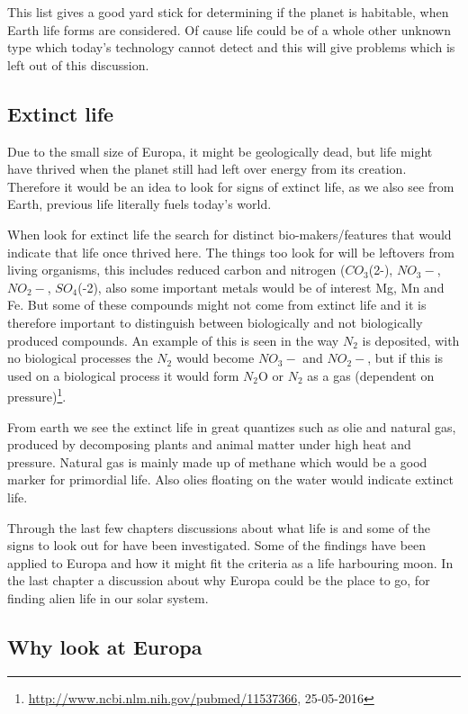 This list gives a good yard stick for determining if the planet is habitable, when Earth life forms are considered. Of cause life could be of a whole other unknown type which today's technology cannot detect and this will give problems which is left out of this discussion.

\subsection{Extinct life}

Due to the small size of Europa, it might be geologically dead, but life might have thrived when the planet still had left over energy from its creation. Therefore it would be an idea to look for signs of extinct life, as we also see from Earth, previous life literally fuels today's world.

When look for extinct life the search for distinct bio-makers/features that would indicate that life once thrived here. The things too look for will be leftovers from living organisms, this includes reduced carbon and nitrogen ($CO_3$(2-), $NO_3-$, $NO_2-$, $SO_4$(-2), also some important metals would be of interest Mg, Mn and Fe. But some of these compounds might not come from extinct life and it is therefore important to distinguish between biologically and not biologically produced compounds. An example of this is seen in the way $N_2$ is deposited, with no biological processes the $N_2$ would become $NO_3-$ and $NO_2-$, but if this is used on a biological process it would form $N_2$O or $N_2$ as a gas  (dependent on pressure)\footnote{\url{http://www.ncbi.nlm.nih.gov/pubmed/11537366}, 25-05-2016}.

From earth we see the extinct life in great quantizes such as olie and natural gas, produced by decomposing plants and animal matter under high heat and pressure. Natural gas is mainly made up of methane which would be a good marker for primordial life. Also olies floating on the water would indicate extinct life.

Through the last few chapters discussions about what life is and some of the signs to look out for have been investigated. Some of the findings have been applied to Europa and how it might fit the criteria as a life harbouring moon. In the last chapter a discussion about why Europa could be the place to go, for finding alien life in our solar system.

\subsection{Why look at Europa}

